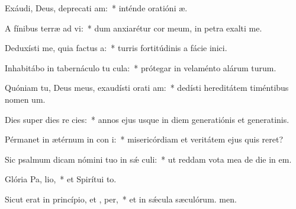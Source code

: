 \item Exáudi, Deus, deprecati am:~* inténde oratióni æ.
\item A fínibus terræ ad  vi:~* dum anxiarétur cor meum, in petra exalti me.
\item Deduxísti me, quia factus   a:~* turris fortitúdinis a fácie inici.
\item Inhabitábo in tabernáculo tu  cula:~* prótegar in velaménto alárum turum.
\item Quóniam tu, Deus meus, exaudísti orati am:~* dedísti hereditátem timéntibus nomen um.
\item Dies super dies re cies:~* annos ejus usque in diem generatiónis et generatinis.
\item Pérmanet in ætérnum in con i:~* misericórdiam et veritátem ejus quis reret?
\item Sic psalmum dicam nómini tuo in sǽ culi:~* ut reddam vota mea de die in em.
\item Glória Pa,  lio,~* et Spirítui to.
\item Sicut erat in princípio, et ,  per,~* et in sǽcula sæculórum. men.
